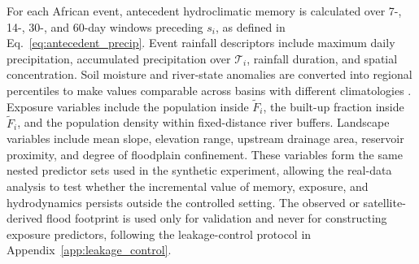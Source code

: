 \documentclass[pdflatex,sn-mathphys-ay]{sn-jnl}
\theoremstyle{thmstyleone}
\begin{document}
For each African event, antecedent hydroclimatic memory is calculated
over 7-, 14-, 30-, and 60-day windows preceding $s_i$, as defined in
Eq.~\eqref{eq:antecedent_precip}.  Event rainfall descriptors include
maximum daily precipitation, accumulated precipitation over
$\mathcal{T}_i$, rainfall duration, and spatial concentration.  Soil
moisture and river-state anomalies are converted into regional
percentiles to make values comparable across basins with different
climatologies \citep{Seneviratne2010,Stephens2015}.  Exposure variables include the population inside
$\widetilde{F}_i$, the built-up fraction inside $\widetilde{F}_i$, and
the population density within fixed-distance river buffers.  Landscape
variables include mean slope, elevation range, upstream drainage area,
reservoir proximity, and degree of floodplain confinement.  These
variables form the same nested predictor sets used in the synthetic
experiment, allowing the real-data analysis to test whether the
incremental value of memory, exposure, and hydrodynamics persists
outside the controlled setting.  The observed or satellite-derived
flood footprint is used only for validation and never for constructing
exposure predictors, following the leakage-control protocol in
Appendix~\ref{app:leakage_control}.
\end{document}
